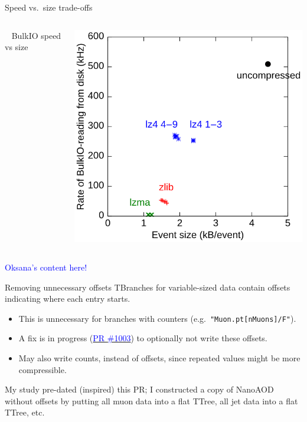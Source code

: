 \documentclass[aspectratio=169]{beamer}
\begin{document}
\begin{frame}{Speed vs.\ size trade-offs}
\begin{columns}
\vspace{2 cm}

\mbox{ } \hfill BulkIO speed vs size \hfill \mbox{ }

\includegraphics[width=\linewidth]{bulk.png}
\end{columns}
\end{frame}

\begin{frame}{}
\begin{center}
\textcolor{blue}{\Huge Oksana's content here!}
\end{center}
\end{frame}

\begin{frame}{Removing unnecessary offsets}
\vspace{0.5 cm}
TBranches for variable-sized data contain offsets indicating where each entry starts.
\begin{itemize}
\item This is unnecessary for branches with counters (e.g.\ {\tt "Muon.pt[nMuons]/F"}).
\item A fix is in progress (\href{https://github.com/root-project/root/pull/1003}{\textcolor{blue}{PR \#1003}}) to optionally not write these offsets.
\item May also write counts, instead of offsets, since repeated values might be more compressible.
\end{itemize}

\vspace{0.5 cm}
\begin{center}
\begin{minipage}{0.7\linewidth}
My study pre-dated (inspired) this PR; I constructed a copy of NanoAOD without offsets by putting all muon data into a flat TTree, all jet data into a flat TTree, etc.
\end{minipage}
\end{center}
\end{frame}
\end{document}
